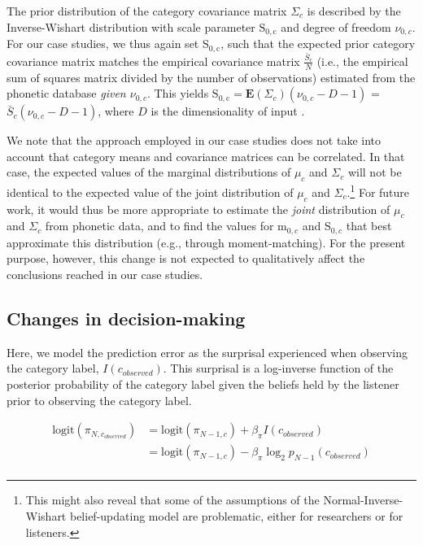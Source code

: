\documentclass[
  11pt,
  man,floatsintext]{apa6}
\begin{document}
The prior distribution of the category covariance matrix \(\Sigma_c\) is described by the Inverse-Wishart distribution with scale parameter \(\mathrm{S_{0,c}}\) and degree of freedom \(\nu_{0,c}\). For our case studies, we thus again set \(\mathrm{S_{0,c}}\), such that the expected prior category covariance matrix matches the empirical covariance matrix \(\frac{\bar{S}_c}{N}\) (i.e., the empirical sum of squares matrix divided by the number of observations) estimated from the phonetic database \emph{given \(\nu_{0,c}\)}. This yields \(\mathrm{S_{0,c}} = \mathbf{E}(\Sigma_c)(\nu_{0,c}-D-1)\) = \(\bar{S}_c(\nu_{0,c}-D-1)\), where \(D\) is the dimensionality of input \autocite[i.e., the number of phonetic cues considered, cf.][p.~134-5]{murphy2012}.

We note that the approach employed in our case studies does not take into account that category means and covariance matrices can be correlated. In that case, the expected values of the marginal distributions of \(\mu_c\) and \(\Sigma_c\) will not be identical to the expected value of the joint distribution of \(\mu_c\) and \(\Sigma_c\).\footnote{This might also reveal that some of the assumptions of the Normal-Inverse-Wishart belief-updating model are problematic, either for researchers or for listeners.} For future work, it would thus be more appropriate to estimate the \emph{joint} distribution of \(\mu_c\) and \(\Sigma_c\) from phonetic data, and to find the values for \(\mathrm{m}_{0,c}\) and \(\mathrm{S}_{0,c}\) that best approximate this distribution (e.g., through moment-matching). For the present purpose, however, this change is not expected to qualitatively affect the conclusions reached in our case studies.

\hypertarget{sec:SI-models-changes-in-decision-making}{%
\subsection{Changes in decision-making}\label{sec:SI-models-changes-in-decision-making}}

Here, we model the prediction error as the surprisal experienced when observing the category label, \(I(c_{observed})\). This surprisal is a log-inverse function of the posterior probability of the category label given the beliefs held by the listener prior to observing the category label.

\begin{equation}\label{eq:bias-updating}
\begin{split}
\mathrm{logit}(\pi_{N,c_{observed}}) & = \mathrm{logit}(\pi_{N-1,c}) + \beta_{\pi} I(c_{observed}) \\
                          & = \mathrm{logit}(\pi_{N-1,c}) - \beta_{\pi} \log_2 p_{N-1}(c_{observed}) \\
\end{split}
\end{equation}
\end{document}
